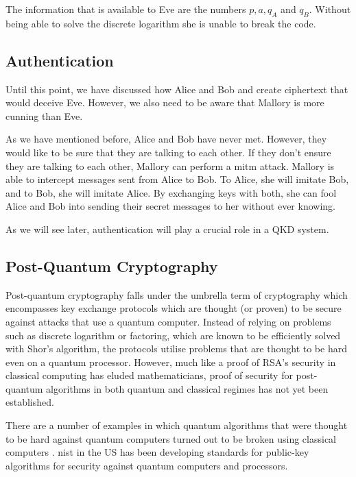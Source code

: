 The information that is available to Eve are the numbers $p, a, q_{A}$ and $q_{B}$. Without being able to solve the discrete logarithm she is unable to break the code. 

\subsection{Authentication}

Until this point, we have discussed how Alice and Bob and create ciphertext that would deceive Eve. However, we also need to be aware that Mallory is more cunning than Eve. 

As we have mentioned before, Alice and Bob have never met. However, they would like to be sure that they are talking to each other. If they don't ensure they are talking to each other, Mallory can perform a \ac{mitm} attack. Mallory is able to intercept messages sent from Alice to Bob. To Alice, she will imitate Bob, and to Bob, she will imitate Alice. By exchanging keys with both, she can fool Alice and Bob into sending their secret messages to her without ever knowing.

As we will see later, authentication will play a crucial role in a \ac{QKD} system.

\subsection{Post-Quantum Cryptography}

Post-quantum cryptography falls under the umbrella term of  cryptography which encompasses key exchange protocols which are thought (or proven) to be secure against attacks that use a quantum computer. Instead of relying on problems such as discrete logarithm or factoring, which are known to be efficiently solved with Shor's algorithm, the protocols utilise problems that are thought to be hard even on a quantum processor. However, much like a proof of RSA's security in classical computing has eluded mathematicians, proof of security for post-quantum algorithms in both quantum and classical regimes has not yet been established.

There are a number of examples in which quantum algorithms that were thought to be hard against quantum computers turned out to be broken using classical computers . \Ac{nist} in the US has been developing standards for public-key algorithms for security against quantum computers and processors.

